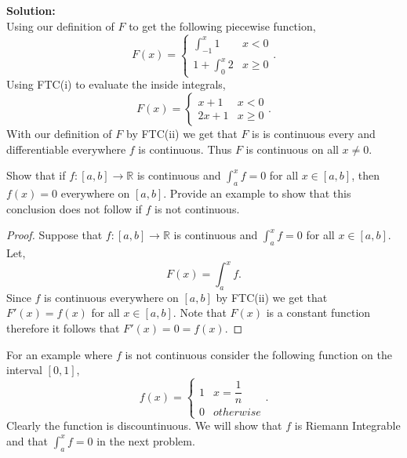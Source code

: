 \documentclass[12pt]{article}
\makeatletter
\theoremstyle{homework}
\newenvironment{exercise}[1]
{\def\@currentlabel{#1}\exercisecore}
{\endexercisecore}
\newcommand{\localhead}[1]{\par\smallskip\noindent\textbf{#1}\nobreak\\}%
\newcommand\solution{\localhead{Solution:}}
\newcommand{\Reals}{\ensuremath{\mathbb R}}
\makeatother
\begin{document}
\begin{exercise}{Abbott 7.5.1}
\begin{enumerate}
	\solution Using our definition of $F$ to get the following piecewise function,
	\begin{equation*}
		F(x) = 
	 \begin{cases} 
			\int_{-1}^x 1 & x < 0 \\
			1 + \int_{0}^x 2 & x \geq 0
		 \end{cases}.
	\end{equation*}
	Using FTC(i) to evaluate the inside integrals,  
	\begin{equation*}
		F(x) = 
	 \begin{cases} 
			x + 1 & x < 0 \\
			2x + 1 & x \geq 0
		 \end{cases}.
	\end{equation*}
	With our definition of $F$ by FTC(ii) we get that $F$ is is continuous every and differentiable everywhere $f$ is continuous.
	Thus $F$ is continuous on all $x \neq 0$.   
	\end{enumerate}
\end{exercise}
\vspace{.5in}
















\begin{exercise}{Abbott 7.5.4} Show that if $f:[a,b] \to \Reals$ is continuous and $\int_a^x f = 0$ for all $x \in [a,b]$,
	then $f(x) = 0$ everywhere on $[a,b]$. Provide an example to show that this conclusion does not follow if $f$ is not continuous. \\

	\begin{proof}
		Suppose that $f:[a,b] \to \Reals$ is continuous and $\int_a^x f = 0$ for all $x \in [a,b]$. Let,
		\begin{equation*}
			F(x) = \int_a^x f.
		\end{equation*}
		Since $f$ is continuous everywhere on $[a,b]$ by FTC(ii) we get that $F'(x) = f(x)$ for all $x \in [a,b]$. Note that $F(x)$ is a constant function therefore it follows that $F'(x) = 0 = f(x)$.
	\end{proof}
	For an example where $f$ is not continuous consider the following function on the interval $[0,1]$,
	\begin{equation*}
		f(x) = 
		\begin{cases} 
			1 & x = \dfrac{1}{n}  \\
			   0 & otherwise
			\end{cases}.
	\end{equation*}
Clearly the function is discountinuous. We will show that $f$ is Riemann Integrable and that $\int_a^x f = 0$ in the next problem. 
\end{exercise}
\vspace{.5in}
\end{document}
